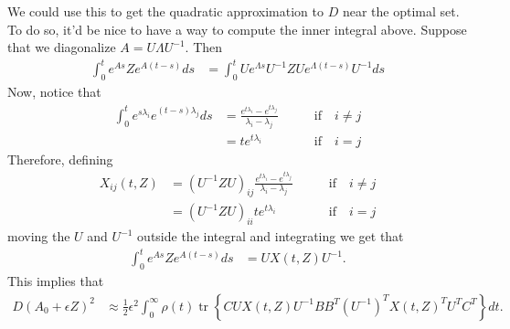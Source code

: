 \documentclass{article}
\newcommand{\tr}{\mathop{\mbox{tr}}} %
\newcommand{\1}{\mathbbm{1}}
\begin{document}
We could use this to get the quadratic approximation to $D$ near the optimal set.
To do so, it'd be nice to have a way to compute the inner integral above.
Suppose that we diagonalize $A = U \Lambda U^{-1}$.
Then
\begin{equation} \label{eqn:exp_deriv}
  \begin{aligned}
      \int_0^t e^{As} Z e^{A(t-s)} ds 
      &=
      \int_0^t U e^{\Lambda s} U^{-1} Z U e^{\Lambda (t-s)} U^{-1} ds 
  \end{aligned}
\end{equation}
Now, notice that
\begin{equation}
  \begin{aligned}
      \int_0^t e^{s \lambda_i} e^{(t-s) \lambda_j} ds
      &=
      \frac{ e^{t \lambda_i} - e^{t \lambda_j} }{ \lambda_i - \lambda_j } 
          \qquad & \text{if} \quad i \neq j \\
      &=
          t e^{t \lambda_i} 
          \qquad & \text{if} \quad i = j 
  \end{aligned}
\end{equation}
Therefore, 
defining
\begin{equation}
    \begin{aligned}
    X_{ij}(t,Z) 
       &= 
        \left( U^{-1} Z U \right)_{ij}
      \frac{ e^{t \lambda_i} - e^{t \lambda_j} }{ \lambda_i - \lambda_j } 
          \qquad & \text{if} \quad i \neq j \\
      &=
          \left( U^{-1} Z U \right)_{ii}
          t e^{t \lambda_i} 
          \qquad & \text{if} \quad i = j 
    \end{aligned}
\end{equation}
moving the $U$ and $U^{-1}$ outside the integral and integrating we get that
\begin{equation}
  \begin{aligned}
      \int_0^t e^{As} Z e^{A(t-s)} ds 
      &=
      U X(t,Z) U^{-1} .
  \end{aligned}
\end{equation}
This implies that
\begin{equation}
    \begin{aligned}
        D(A_0+\epsilon Z)^2
        &\approx \frac{1}{2} \epsilon^2 
        \int_0^\infty
            \rho(t) \tr\left\{ C U X(t,Z) U^{-1} B B^T (U^{-1})^T X(t,Z)^T U^T C^T \right\}
        dt .
    \end{aligned}
\end{equation}
\end{document}
